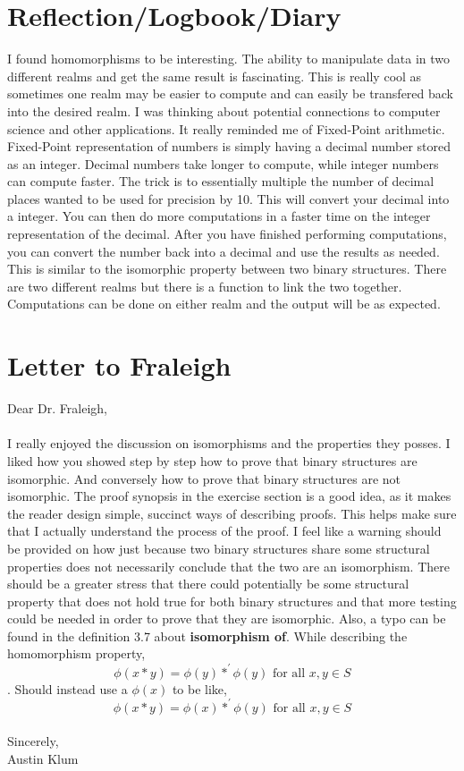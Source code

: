 \documentclass[11pt]{article}
\theoremstyle{plain}
\theoremstyle{definition}
\begin{document}
\section{Reflection/Logbook/Diary}
I found homomorphisms to be interesting. The ability to manipulate data in two different realms and get the same result is fascinating. This is really cool as sometimes one realm may be easier to compute and can easily be transfered back into the desired realm. I was thinking about potential connections to computer science and other applications. It really reminded me of Fixed-Point arithmetic. Fixed-Point representation of numbers is simply having a decimal number stored as an integer. Decimal numbers take longer to compute, while integer numbers can compute faster. The trick is to essentially multiple the number of decimal places wanted to be used for precision by 10. This will convert your decimal into a integer. You can then do more computations in a faster time on the integer representation of the decimal. After you have finished performing computations, you can convert the number back into a decimal and use the results as needed. This is similar to the isomorphic property between two binary structures. There are two different realms but there is a function to link the two together. Computations can be done on either realm and the output will be as expected.

\section{Letter to Fraleigh}
Dear Dr. Fraleigh,\\
\\
I really enjoyed the discussion on isomorphisms and the properties they posses. I liked how you showed step by step how to prove that binary structures are isomorphic. And conversely how to prove that binary structures are not isomorphic. The proof synopsis in the exercise section is a good idea, as it makes the reader design simple, succinct ways of describing proofs. This helps make sure that I actually understand the process of the proof. I feel like a warning should be provided on how just because two binary structures share some structural properties does not necessarily conclude that the two are an isomorphism. There should be a greater stress that there could potentially be some structural property that does not hold true for both binary structures and that more testing could be needed in order to prove that they are isomorphic. Also, a typo can be found in the definition 3.7 about \textbf{isomorphism of}. While describing the homomorphism property, \[\phi(x*y)=\phi(y)*^{'}\phi(y) \text{ for all } x,y \in S\].
Should instead use a $\phi(x)$  to be like,
\[\phi(x*y)=\phi(x)*^{'}\phi(y) \text{ for all } x,y \in S\]
\\
Sincerely,\\
Austin Klum
\end{document}
